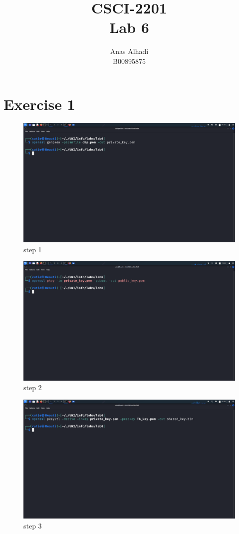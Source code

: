 \documentclass{article}
\title{\textbf{CSCI-2201\\Lab 6}}
\author{Anas Alhadi\\B00895875}
\numberwithin{equation}{subsection}
\begin{document}
	\maketitle
	\tableofcontents


	\newpage
	\section{Exercise 1}
	\begin{center}
	\begin{figure}[H]
		\includegraphics[width=400pt]{pic/1.1.png}
		\caption{step 1}
	\end{figure}

	\begin{figure}[H]
		\includegraphics[width=400pt]{pic/1.2.png}
		\caption{step 2}
	\end{figure}

	\begin{figure}[H]
		\includegraphics[width=400pt]{pic/1.3.png}
		\caption{step 3}
	\end{figure}


\end{center}
\end{document}
